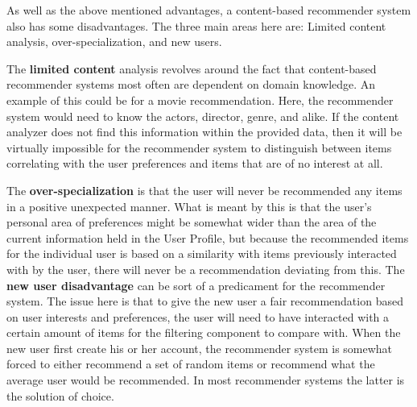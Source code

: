 As well as the above mentioned advantages, a content-based recommender system also has some disadvantages. The three main areas here are: Limited content analysis, over-specialization, and new users.\newline

The \textbf{limited content} analysis revolves around the fact that content-based recommender systems most often are dependent on domain knowledge. An example of this could be for a movie recommendation. Here, the recommender system would need to know the actors, director, genre, and alike. If the content analyzer does not find this information within the provided data, then it will be virtually impossible for the recommender system to distinguish between items correlating with the user preferences and items that are of no interest at all.\newline

The \textbf{over-specialization} is that the user will never be recommended any items in a positive unexpected manner. What is meant by this is that the user's personal area of preferences might be somewhat wider than the area of the current information held in the User Profile, but because the recommended items for the individual user is based on a similarity with items previously interacted with by the user, there will never be a recommendation deviating from this.\newline
The \textbf{new user disadvantage} can be sort of a predicament for the recommender system. The issue here is that to give the new user a fair recommendation based on user interests and preferences, the user will need to have interacted with a certain amount of items for the filtering component to compare with. When the new user first create his or her account, the recommender system is somewhat forced to either recommend a set of random items or recommend what the average user would be recommended. In most recommender systems the latter is the solution of choice.

